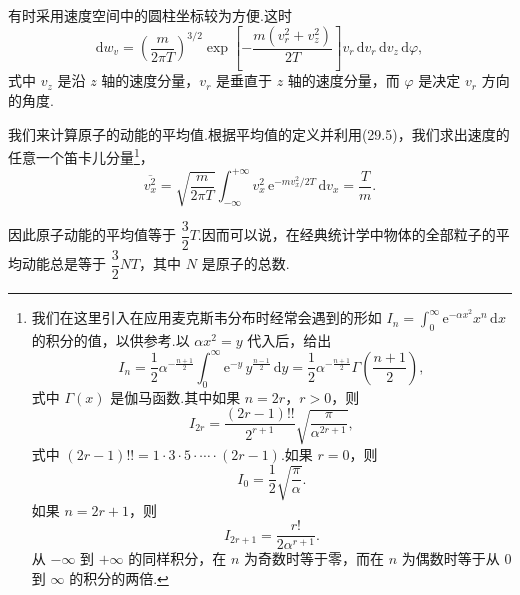 有时采用速度空间中的圆柱坐标较为方便.这时
\begin{equation}
  \mathrm{d}w_v=\left(\frac{m}{2\pi T}\right)^{3/2}\exp\left[-\frac{m\left(v_r^2+v_z^2\right)}{2T}\right]v_r\,\mathrm{d}v_r\,\mathrm{d}v_z\,\mathrm{d}\varphi,
\end{equation}
式中 $v_z$ 是沿 $z$ 轴的速度分量，$v_r$ 是垂直于 $z$ 轴的速度分量，而 $\varphi$ 是决定 $v_r$ 方向的角度.

我们来计算原子的动能的平均值.根据平均值的定义并利用(29.5)，我们求出速度的任意一个笛卡儿分量\footnote{我们在这里引入在应用麦克斯韦分布时经常会遇到的形如
$I_n=\int_0^{\infty}\mathrm{e}^{-\alpha x^2}x^n\,\mathrm{d}x$
的积分的值，以供参考.以 $\alpha x^2=y$ 代入后，给出
\begin{equation*}
  I_n=\frac{1}{2}\alpha^{-\frac{n+1}{2}}\int_0^{\infty}\mathrm{e}^{-y}\,y^{\frac{n-1}{2}}\,\mathrm{d}y
  =\frac{1}{2}\alpha^{-\frac{n+1}{2}}\Gamma\left(\frac{n+1}{2}\right),
\end{equation*}
式中 $\Gamma(x)$ 是伽马函数.其中如果 $n=2r$，$r>0$，则
\begin{equation*}
  I_{2r}=\frac{(2r-1)!!}{2^{r+1}}\sqrt{\frac{\pi}{\alpha^{2r+1}}},
\end{equation*}
式中 $(2r-1)!!=1\cdot3\cdot5\cdot\cdots\cdot(2r-1)$.如果 $r=0$，则
\begin{equation*}
  I_0=\frac{1}{2}\sqrt{\frac{\pi}{\alpha}}.
\end{equation*}
如果 $n=2r+1$，则
\begin{equation*}
  I_{2r+1}=\frac{r!}{2\alpha^{r+1}}.
\end{equation*}
从 $-\infty$ 到 $+\infty$ 的同样积分，在 $n$ 为奇数时等于零，而在 $n$ 为偶数时等于从 0 到 $\infty$ 的积分的两倍.}，
\begin{equation}
  \overline{v_x^2}=\sqrt{\frac{m}{2\pi T}}\int_{-\infty}^{+\infty}v_x^2\,\mathrm{e}^{-mv_x^2/2T}\,\mathrm{d}v_x=\frac{T}{m}.
\end{equation}

因此原子动能的平均值等于 $\dfrac{3}{2}T$.因而可以说，在经典统计学中物体的全部粒子的平均动能总是等于 $\dfrac{3}{2}NT$，其中 $N$ 是原子的总数.

